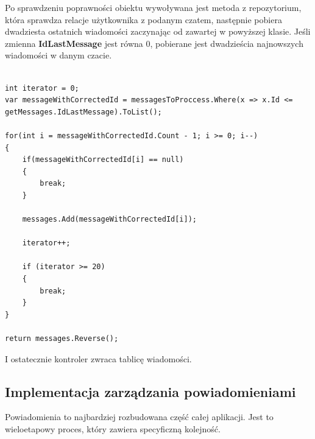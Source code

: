 \documentclass[12pt,a4paper]{article}
\begin{document}
Po sprawdzeniu poprawności obiektu wywoływana jest metoda z repozytorium, która sprawdza relacje użytkownika z podanym czatem, następnie pobiera dwadziesta ostatnich wiadomości zaczynając od zawartej w powyższej klasie. Jeśli zmienna \textbf{IdLastMessage} jest równa 0, pobierane jest dwadzieścia najnowszych wiadomości w danym czacie.

\begin{lstlisting}[caption={Implementacja pobierania ostatnich 20 wiadomości}]

int iterator = 0;
var messageWithCorrectedId = messagesToProccess.Where(x => x.Id <= getMessages.IdLastMessage).ToList();

for(int i = messageWithCorrectedId.Count - 1; i >= 0; i--)
{
	if(messageWithCorrectedId[i] == null)
	{
		break;
	}

	messages.Add(messageWithCorrectedId[i]);

	iterator++;

	if (iterator >= 20)
	{
		break;
	}
}

return messages.Reverse();
\end{lstlisting}

I ostatecznie kontroler zwraca tablicę wiadomości.

\subsection{Implementacja zarządzania powiadomieniami} 
\hspace*{0.7cm} Powiadomienia to najbardziej rozbudowana część całej aplikacji. Jest to wieloetapowy proces, który zawiera specyficzną kolejność. 
\end{document}
